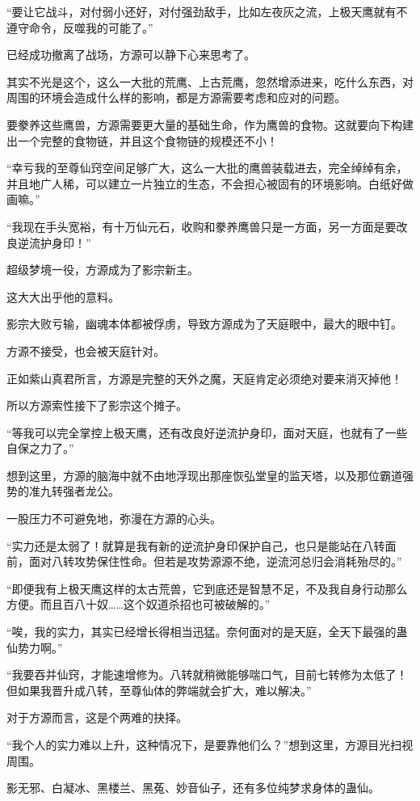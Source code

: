 \begin{this_body}
“要让它战斗，对付弱小还好，对付强劲敌手，比如左夜灰之流，上极天鹰就有不遵守命令，反噬我的可能了。”

已经成功撤离了战场，方源可以静下心来思考了。

其实不光是这个，这么一大批的荒鹰、上古荒鹰，忽然增添进来，吃什么东西，对周围的环境会造成什么样的影响，都是方源需要考虑和应对的问题。

要豢养这些鹰兽，方源需要更大量的基础生命，作为鹰兽的食物。这就要向下构建出一个完整的食物链，并且这个食物链的规模还不小！

“幸亏我的至尊仙窍空间足够广大，这么一大批的鹰兽装载进去，完全绰绰有余，并且地广人稀，可以建立一片独立的生态，不会担心被固有的环境影响。白纸好做画嘛。”

“我现在手头宽裕，有十万仙元石，收购和豢养鹰兽只是一方面，另一方面是要改良逆流护身印！”

超级梦境一役，方源成为了影宗新主。

这大大出乎他的意料。

影宗大败亏输，幽魂本体都被俘虏，导致方源成为了天庭眼中，最大的眼中钉。

方源不接受，也会被天庭针对。

正如紫山真君所言，方源是完整的天外之魔，天庭肯定必须绝对要来消灭掉他！

所以方源索性接下了影宗这个摊子。

“等我可以完全掌控上极天鹰，还有改良好逆流护身印，面对天庭，也就有了一些自保之力了。”

想到这里，方源的脑海中就不由地浮现出那座恢弘堂皇的监天塔，以及那位霸道强势的准九转强者龙公。

一股压力不可避免地，弥漫在方源的心头。

“实力还是太弱了！就算是我有新的逆流护身印保护自己，也只是能站在八转面前，面对八转攻势保住性命。但若是攻势源源不绝，逆流河总归会消耗殆尽的。”

“即便我有上极天鹰这样的太古荒兽，它到底还是智慧不足，不及我自身行动那么方便。而且百八十奴……这个奴道杀招也可被破解的。”

“唉，我的实力，其实已经增长得相当迅猛。奈何面对的是天庭，全天下最强的蛊仙势力啊。”

“我要吞并仙窍，才能速增修为。八转就稍微能够喘口气，目前七转修为太低了！但如果我晋升成八转，至尊仙体的弊端就会扩大，难以解决。”

对于方源而言，这是个两难的抉择。

“我个人的实力难以上升，这种情况下，是要靠他们么？”想到这里，方源目光扫视周围。

影无邪、白凝冰、黑楼兰、黑菟、妙音仙子，还有多位纯梦求身体的蛊仙。


\end{this_body}
